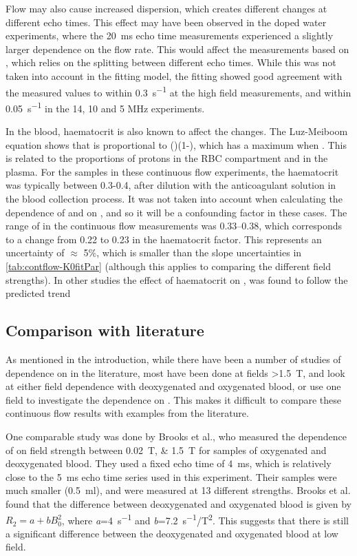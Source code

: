 Flow may also cause increased dispersion, which creates different \Ttwo changes at different echo times.
This effect may have been observed in the doped water experiments, where the \SI{20}{ms} echo time \Ttwo measurements experienced a slightly larger dependence on the flow rate.
This would affect the measurements based on \Kzero, which relies on the splitting between different echo times.
While this was not taken into account in the fitting model, the \Kzero fitting showed good agreement with the measured \Rtwo values to within \SI{0.3}{s^{-1}} at the high field measurements, and within \SI{0.05}{s^{-1}} in the 14, 10 and 5 MHz experiments.

In the blood, haematocrit is also known to affect the \Ttwo changes.
The Luz-Meiboom equation shows that \Kzero is proportional to (\Hct)(1-\Hct), which has a maximum when .
This is related to the proportions of protons in the RBC compartment and in the plasma.
For the samples in these continuous flow experiments, the haematocrit was typically between 0.3-0.4, after dilution with the anticoagulant solution in the blood collection process.
It was not taken into account when calculating the dependence of \Rtwo and \Kzero on \SOtwo, and so it will be a confounding factor in these cases.
The range of \Hct in the continuous flow measurements was \numrange{0.33}{0.38}, which corresponds to a change from \num{0.22} to \num{0.23} in the haematocrit factor.
This represents an uncertainty of $\approx$ 5\%, which is smaller than the slope uncertainties in \autoref{tab:contflow-K0fitPar} (although this applies to comparing the different field strengths).
In other studies the effect of haematocrit on \Ttwo, was found to follow the predicted trend \cite{GolayMeasurementtissueoxygen2001,ZhaoOxygenationhematocritdependence2007,PortnoyRelaxationpropertieshuman2017}


\subsection{Comparison with literature}
\label{sec:contflow-litcomp}
As mentioned in the introduction, while there have been a number of studies of \Ttwo dependence on \SOtwo in the literature, most have been done at fields \SI{>1.5}{T}, and look at either field dependence with deoxygenated and oxygenated blood, or use one field to investigate the dependence on \SOtwo.
This makes it difficult to compare these continuous flow results with examples from the literature.

One comparable study was done by Brooks et al., who measured the dependence of \Ttwo on field strength between \SIlist{0.02;1.5}{T} for samples of oxygenated and deoxygenated blood\cite{BrooksComparisont2relaxation1995}.
They used a fixed echo time of \SI{4}{ms}, which is relatively close to the \SI{5}{ms} echo time series used in this experiment.
Their samples were much smaller (\SI{0.5}{ml}), and were measured at 13 different \Bzero strengths.
Brooks et al. found that the difference between deoxygenated and oxygenated blood is given by $R_2 = a + bB_0^2$, where \textit{a}=\SI{4}{s^{-1}} and \textit{b}=\SI{7.2}{s^{-1}/T^2}.
This suggests that there is still a significant difference between the deoxygenated and oxygenated blood at low field.

